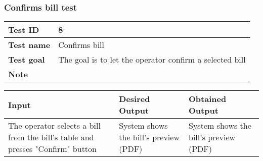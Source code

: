 {{		\subsubsection{Confirms bill test}{
			\begin{table}[h]
			\begin{tabular}{|p{4cm}|p{10cm}|}
			\hline
				\centering \vspace{1mm} \bfseries{Test ID} \vspace{1mm} & 
				\vspace{1mm} 8 \vspace{1mm}\\
			\hline
				\centering \vspace{1mm} \bfseries{Test name} \vspace{1mm} & 
				\vspace{1mm} Confirms bill \vspace{1mm}\\
			\hline
				\centering \vspace{1mm} \bfseries{Test goal} \vspace{1mm} & 
				\vspace{1mm} The goal is to let the operator confirm a selected bill\vspace{1mm}\\
			\hline
				\centering \vspace{1mm} \bfseries{Note} \vspace{1mm} & 
				\vspace{1mm}  \vspace{1mm}\\
			\hline
			\end{tabular}
			\end{table}

			\begin{table}[h]
			\begin{tabular}{|p{4cm}|p{5cm}|p{5cm}|}
			\hline
			\centering \vspace{1mm} \bfseries{Input} \vspace{1mm} & \vspace{1mm} \bfseries{Desired Output} \vspace{1mm} & \vspace{1mm} \bfseries{Obtained Output} \vspace{1mm}\\
			\hline
				\vspace{1mm} The operator selects a bill from the bill's table and presses "Confirm" button \vspace{1mm} &
				\vspace{1mm} System shows the bill's preview (PDF) \vspace{1mm} & 
				\vspace{1mm} System shows the bill's preview (PDF) \vspace{1mm} \\
			\hline
			\end{tabular}
			\end{table}
		}
		\clearpage

}}
